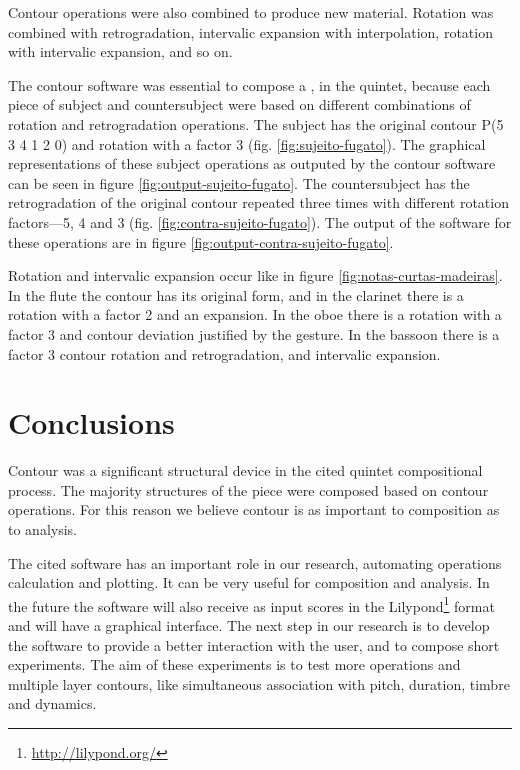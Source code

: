 Contour operations were also combined to produce new material.
Rotation was combined with retrogradation, intervalic expansion with
interpolation, rotation with intervalic expansion, and so on.

The contour software was essential to compose a , in the
quintet, because each piece of subject and countersubject were based
on different combinations of rotation and retrogradation operations.
The subject has the original contour P(5 3 4 1 2 0) and rotation with
a factor 3 (fig. \ref{fig:sujeito-fugato}). The graphical
representations of these subject operations as outputed by the contour
software can be seen in figure \ref{fig:output-sujeito-fugato}. The
countersubject has the retrogradation of the original contour repeated
three times with different rotation factors---5, 4 and 3 (fig.
\ref{fig:contra-sujeito-fugato}). The output of the software for these
operations are in figure \ref{fig:output-contra-sujeito-fugato}.

Rotation and intervalic expansion occur like in figure
\ref{fig:notas-curtas-madeiras}. In the flute the contour has its
original form, and in the clarinet there is a rotation with a factor 2
and an expansion. In the oboe there is a rotation with a factor 3 and
contour deviation justified by the gesture. In the bassoon there is a
factor 3 contour rotation and retrogradation, and intervalic
expansion.

\section{Conclusions}
\label{sec:conclusions}

Contour was a significant structural device in the cited quintet
compositional process. The majority structures of the piece were
composed based on contour operations. For this reason we believe
contour is as important to composition as to analysis.

The cited software has an important role in our research, automating
operations calculation and plotting. It can be very useful for
composition and analysis. In the future the software will also receive
as input scores in the Lilypond\footnote{\url{http://lilypond.org/}}
format and will have a graphical interface. The next step in our
research is to develop the software to provide a better interaction
with the user, and to compose short experiments. The aim of these
experiments is to test more operations and multiple layer contours,
like simultaneous association with pitch, duration, timbre and
dynamics.

